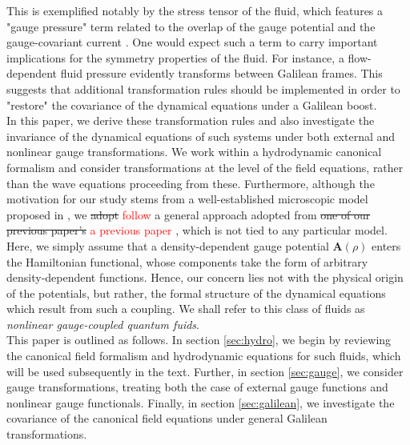 \documentclass[twocolumn, nofootinbib, nobibnotes, amsmath,amssymb,aps, pra, floatfix]{revtex4-1}
\renewcommand{\v}[1]{\ensuremath{\mathbf{#1}}} %
\begin{document}
This is exemplified notably by the stress tensor of the fluid, which features a "gauge pressure" term related to the overlap of the gauge potential and the gauge-covariant current \cite{buggy2020hydrodynamics}.
One would expect such a term to carry important implications for the symmetry properties of the fluid.
For instance, a flow-dependent fluid pressure evidently transforms between Galilean frames.
This suggests that additional transformation rules should be implemented in order to "restore" the covariance of the dynamical equations under a Galilean boost.\\
In this paper, we derive these transformation rules and also investigate the invariance of the dynamical equations of such systems under both external and nonlinear gauge transformations.
We work within a hydrodynamic canonical formalism and consider transformations at the level of the field equations, rather than the wave equations proceeding from these.
Furthermore, although the motivation for our study stems from a well-established microscopic model proposed in \cite{edmonds2013}, we \sout{adopt} \textcolor{red}{follow} a general approach adopted from \sout{one of our previous paper's} \textcolor{red}{a previous paper} \cite{buggy2020hydrodynamics}, which is not tied to any particular model.
Here, we simply assume that a density-dependent gauge potential $\v{A}\left(\rho\right)$ enters the Hamiltonian functional, whose components take the form of arbitrary density-dependent functions.
Hence, our concern lies not with the physical origin of the potentials, but rather, the formal structure of the dynamical equations which result from such a coupling.
We shall refer to this class of fluids as \textit{nonlinear gauge-coupled quantum fuids}. \\
This paper is outlined as follows.
In section \ref{sec:hydro}, we begin by reviewing the canonical field formalism and hydrodynamic equations for such fluids, which will be used subsequently in the text.
Further, in section \ref{sec:gauge}, we consider gauge transformations, treating both the case of external gauge functions and nonlinear gauge functionals.
Finally, in section \ref{sec:galilean}, we investigate the covariance of the canonical field equations under general Galilean transformations.
\end{document}
